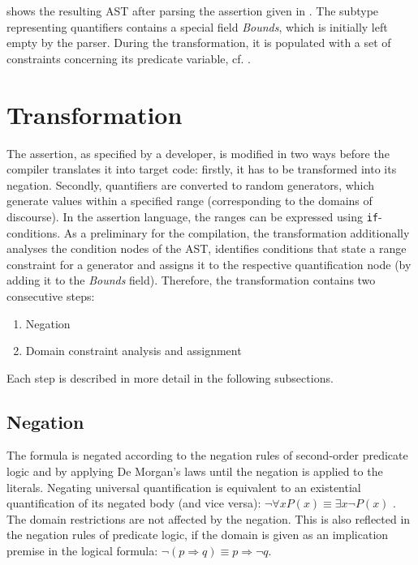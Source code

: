  shows the resulting AST after parsing the assertion given in . The subtype representing quantifiers contains a special field \textit{Bounds}, which is initially left empty by the parser. During the transformation, it is populated with a set of constraints concerning its predicate variable, cf. .

\section{Transformation}\label{sec:transformation}
The assertion, as specified by a developer, is modified in two ways before the compiler translates it into target code: firstly, it has to be transformed into its negation. Secondly, quantifiers are converted to random generators, which generate values within a specified range (corresponding to the domains of discourse). In the assertion language, the ranges can be expressed using \texttt{if}-conditions. As a preliminary for the compilation, the transformation additionally analyses the condition nodes of the AST, identifies conditions that state a range constraint for a generator and assigns it to the respective quantification node (by adding it to the \textit{Bounds} field). Therefore, the transformation contains two consecutive steps:
\begin{enumerate}
\itemsep-0.5em
\item Negation
\item Domain constraint analysis and assignment
\end{enumerate}
Each step is described in more detail in the following subsections.

\subsection{Negation}
The formula is negated according to the negation rules of second-order predicate logic and by applying De Morgan's laws \cite{de_morgan} until the negation is applied to the literals. Negating universal quantification is equivalent to an existential quantification of its negated body (and vice versa): $\neg \forall x P(x) \equiv \exists x \neg P(x)$ \cite{Sundstrom2020Quantifiers}. The domain restrictions are not affected by the negation. This is also reflected in the negation rules of predicate logic, if the domain is given as an implication premise in the logical formula: $\neg (p \Rightarrow q) \equiv p \Rightarrow \neg q $. 

